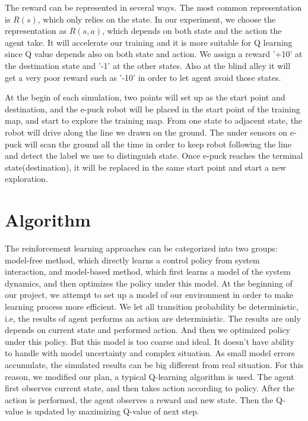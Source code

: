 \documentclass[a4paper, 11pt]{article} %
\begin{document}
The reward can be represented in several ways. The most common representation is $R(s)$, which only relies on the state. In our experiment, we choose the representation as $R(s,a)$, which depends on both state and the action the agent take. It will accelerate our training and it is more suitable for Q learning since Q value depends also on both state and action. We assign a reward '+10' at the destination
state and '-1' at the other states. Also at the blind alley it will get a very poor
reward such as '-10' in order to let agent avoid those states.

At the begin of
each simulation, two points will set up as the start point and destination,
and the e-puck robot will be placed in the start point of the training map, and
start to explore the training map. From one state to adjacent state, the robot will
drive along the line we drawn on the ground. The under sensors on e-puck
will scan the ground all the time in order to keep robot following the line
and detect the label we use to distinguish state. Once e-puck reaches the terminal
state(destination), it will be replaced in the same start point and start a new exploration.

\section{Algorithm}
The reinforcement learning approaches can be categorized into two groups: model-free
method, which directly learns a control policy from system interaction, and
model-based method, which first learns a model of the system dynamics, and then
optimizes the policy under this model. At the beginning of our project, we attempt to
set up a model of our environment in order to make learning process more efficient.
We let all transition probability be deterministic, i.e, the results of agent performs
an action are deterministic. The results are only depends on current state and performed
action. And then we optimized policy under this policy. But this model is too coarse
and ideal. It doesn't have ability to handle with model uncertainty and complex situation.
As small model errors accumulate, the simulated results can be big different from
real situation. For this reason, we modified our plan, a typical Q-learning algorithm
is used. The agent first observes current state, and then takes action according to
policy. After the action is performed, the agent observes a reward and new state.
Then the Q-value is updated by maximizing Q-value of next step.
\end{document}

